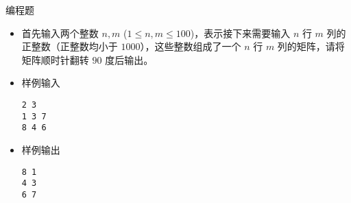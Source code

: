 \begin{frame}[fragile]
{{\begin{exampleblock}{编程题}
                \begin{itemize}
                    \item 首先输入两个整数 $n,m$ ($1 \le n,m \le 100$)，表示接下来需要输入 $n$ 行 $m$ 列的正整数（正整数均小于 $1000$），这些整数组成了一个 $n$ 行 $m$ 列的矩阵，请将矩阵顺时针翻转 $90$ 度后输出。

                    \item 样例输入

                        \lstinline|2 3|\\
                        \lstinline|1 3 7|\\
                        \lstinline|8 4 6|

                    \item 样例输出

                        \lstinline|8 1|\\
                        \lstinline|4 3|\\
                        \lstinline|6 7|

                \end{itemize}

            \end{exampleblock}
        }
    }
\end{frame}

